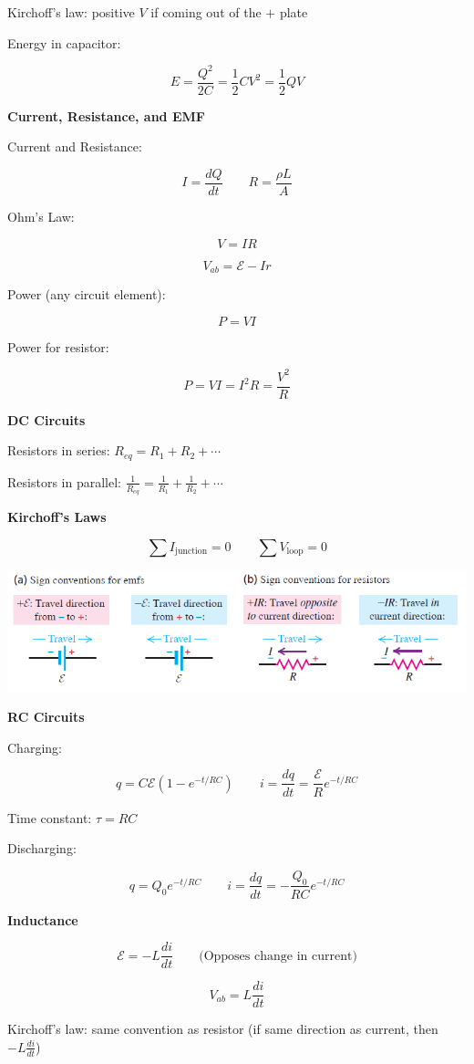 \documentclass[10pt]{article}
\newcommand{\EP}{\mathcal{E}}
\newcommand\sectionheading[1]{\begin{center}\large{\textbf{#1}}\end{center}\normalsize}
\newcommand\heading[1]{\medskip\textbf{#1}\medskip}
\begin{document}
\begin{multicols*}{3}
Kirchoff's law: positive $V$ if coming out of the $+$ plate

Energy in capacitor:

\[E=\frac{Q^2}{2C}=\frac12 CV^2=\frac12 QV\]

\sectionheading{Current, Resistance, and EMF}

Current and Resistance:

\[I=\frac{dQ}{dt} \qquad R=\frac{\rho L}{A}\]

Ohm's Law:

\[V=IR\]

\[V_{ab}=\EP-Ir\]

Power (any circuit element):

\[P=VI\]

Power for resistor:

\[P=VI=I^2R=\frac{V^2}{R}\]

\sectionheading{DC Circuits}

Resistors in series: $R_{eq}=R_1+R_2+\cdots$

Resistors in parallel: $\frac{1}{R_{eq}}=\frac{1}{R_1}+\frac{1}{R_2}+\cdots$

\heading{Kirchoff's Laws}

\[\sum I_{\text{junction}}=0 \qquad \sum V_{\text{loop}}=0\]

\includegraphics[scale=0.4]{images/fs_kirchoff_signs.png}

\heading{RC Circuits}

Charging: 

\[q=C\EP(1-e^{-t/RC}) \qquad i=\frac{dq}{dt}=\frac{\EP}{R}e^{-t/RC}\]

Time constant: $\tau=RC$

Discharging:

\[q=Q_0 e^{-t/RC} \qquad i=\frac{dq}{dt}=-\frac{Q_0}{RC}e^{-t/RC}\]

\sectionheading{Inductance}

\[\EP=-L\frac{di}{dt}\qquad\text{(Opposes change in current)}\]

\[V_{ab}=L\frac{di}{dt}\]

Kirchoff's law: same convention as resistor (if same direction as current, then $-L\frac{di}{dt}$)


\end{multicols*}
\end{document}
